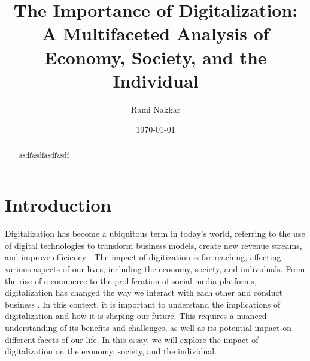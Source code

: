 \documentclass[12pt]{article}
\begin{document}
\onehalfspacing

\title{The Importance of Digitalization: A Multifaceted Analysis of Economy, Society, and the Individual}
\author{Rami Nakkar}
\date{\today}
\maketitle

\begin{abstract}
asdfasdfasdfasdf
\end{abstract}

\newpage

\section{Introduction}
Digitalization has become a ubiquitous term in today's world, referring to the use of digital technologies to transform business models, create new revenue streams, and improve efficiency \cite{Gartner.5312023}. The impact of digitization is far-reaching, affecting various aspects of our lives, including the economy, society, and individuals. From the rise of e-commerce to the proliferation of social media platforms, digitalization has changed the way we interact with each other and conduct business \cite{WillemvanWinden.2017}. In this context, it is important to understand the implications of digitalization and how it is shaping our future. This requires a nuanced understanding of its benefits and challenges, as well as its potential impact on different  facets of our life. In this essay, we will explore the impact of digitalization on the economy, society, and the individual.
\end{document}
